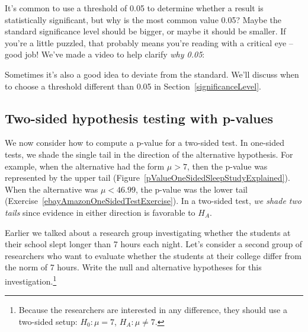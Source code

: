 \begin{termBox}{
It's common to use a threshold of 0.05 to determine whether a result is statistically significant, but why is the most common value 0.05? Maybe the standard significance level should be bigger, or maybe it should be smaller. If you're a little puzzled, that probably means you're reading with a critical eye -- good job! We've made a video to help clarify \emph{why 0.05}:
\begin{center}
\end{center}
Sometimes it's also a good idea to deviate from the standard. We'll discuss when to choose a threshold different than 0.05 in Section~\ref{significanceLevel}.\vspace{0.5mm}}
\end{termBox}


\subsection{Two-sided hypothesis testing with p-values}
\label{twoSidedTestsWithPValues}


We now consider how to compute a p-value for a two-sided test. In one-sided tests, we shade the single tail in the direction of the alternative hypothesis. For example, when the alternative had the form $\mu > 7$, then the p-value was represented by the upper tail (Figure~\ref{pValueOneSidedSleepStudyExplained}). When the alternative was $\mu < 46.99$, the p-value was the lower tail (Exercise~\ref{ebayAmazonOneSidedTestExercise}). In a two-sided test, \emph{we shade two tails} since evidence in either direction is favorable to $H_A$.

\begin{exercise} \label{2ndSchSleepHypSetupExercise}
Earlier we talked about a research group investigating whether the students at their school slept longer than 7 hours each night. Let's consider a second group of researchers who want to evaluate whether the students at their college differ from the norm of 7 hours. Write the null and alternative hypotheses for this investigation.\footnote{Because the researchers are interested in any difference, they should use a two-sided setup: $H_0: \mu = 7$, $H_A: \mu \neq 7$.}
\end{exercise}

